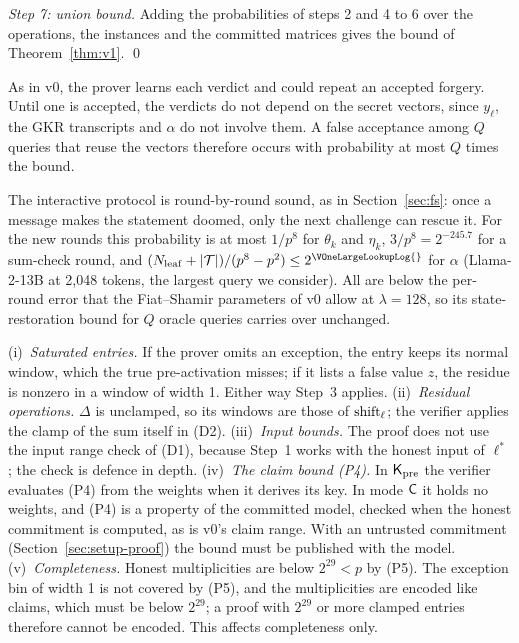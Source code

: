 \emph{Step 7: union bound.} Adding the probabilities of steps 2 and 4 to 6 over the operations,
the instances and the committed matrices gives the bound of Theorem~\ref{thm:v1}. \qed

 As in v0, the prover learns each verdict and could repeat an accepted
forgery. Until one is accepted, the verdicts do not depend on the secret vectors, since $y_\ell$,
the GKR transcripts and $\alpha$ do not involve them. A false acceptance among $Q$ queries that
reuse the vectors therefore occurs with probability at most $Q$ times the bound.

 The interactive protocol is round-by-round sound, as in
Section~\ref{sec:fs}: once a message makes the statement doomed, only the next challenge can rescue
it. For the new rounds this probability is at most $1/p^8$ for $\theta_k$ and $\eta_k$, $3/p^8 =
2^{-245.7}$ for a sum-check round, and $(\Nleaf + |\Vtab|)/(p^8 - p^2) \le 2^{\VOneLargeLookupLog{}}$ for
$\alpha$ (Llama-2-13B at 2{,}048 tokens, the largest query we consider). All are below the per-round error that the Fiat--Shamir parameters of v0 allow at
$\lambda = 128$, so its state-restoration bound for $Q$ oracle queries carries over unchanged.

 (i)~\emph{Saturated entries.} If the prover omits an exception, the entry keeps its
normal window, which the true pre-activation misses; if it lists a false value $z$, the residue is
nonzero in a window of width 1. Either way Step~3 applies. (ii)~\emph{Residual operations.}
$\Delta$ is unclamped, so its windows are those of $\mathrm{shift}_\ell$; the verifier applies the clamp
of the sum itself in (D2). (iii)~\emph{Input bounds.} The proof does not use the input range check
of (D1), because Step~1 works with the honest input of $\ell^\ast$; the check is defence in depth.
(iv)~\emph{The claim bound (P4).} In $\mathsf{K}_{\mathrm{pre}}$ the verifier evaluates (P4) from the weights when it derives its key. In
mode $\mathsf{C}$ it holds no weights, and (P4) is a property of the committed model, checked when the
honest commitment is computed, as is v0's claim range. With an untrusted commitment
(Section~\ref{sec:setup-proof}) the bound must be published with the model. (v)~\emph{Completeness.}
Honest multiplicities are below $2^{29} < p$ by (P5). The exception bin of width 1 is not covered
by (P5), and the multiplicities are encoded like claims, which must be below $2^{29}$; a proof with
$2^{29}$ or more clamped entries therefore cannot be encoded. This affects completeness only.
